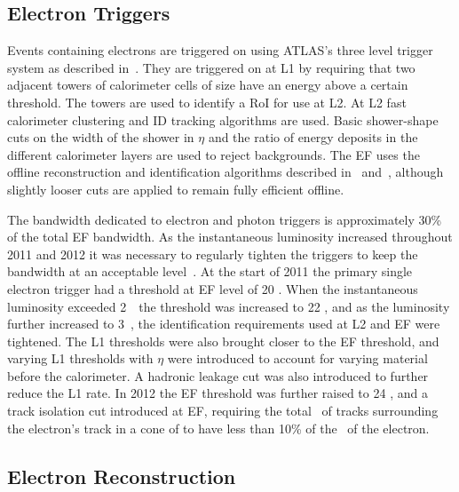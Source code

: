 \subsection{Electron Triggers}
\label{sec:reco-el-triggers}

Events containing electrons are triggered on using ATLAS's three level trigger
system as described in~. They are triggered on at L1 by
requiring that two adjacent towers of calorimeter cells of size
 have an energy above a certain threshold. The towers
are used to identify a RoI for use at L2. At L2 fast calorimeter clustering and
ID tracking algorithms are used. 
Basic shower-shape cuts on the width of the shower in $\eta$ and the ratio of
energy deposits in the different calorimeter layers are used to reject
backgrounds. The EF uses the offline reconstruction and identification
algorithms described in~ and~, although
slightly looser cuts are applied to remain fully efficient offline. 

The bandwidth dedicated to electron and photon triggers is approximately 30\% of the
total EF bandwidth. As the instantaneous luminosity increased throughout 2011 and
2012 it was necessary to regularly tighten the triggers to keep the bandwidth at
an acceptable level~\cite{Monticelli:1450947}. At the start of 2011 the primary single electron trigger
had a threshold at EF level of 20 \gev. When the instantaneous luminosity exceeded
2~\instlumiunit\ the threshold was increased to 22 \gev, and as
the luminosity further increased to 3~\instlumiunit, the identification
requirements used at L2 and EF were tightened. The L1 thresholds were also
brought closer to the EF threshold, and varying L1 thresholds with $\eta$ were
introduced to account for varying material before the calorimeter. A hadronic
leakage cut was also introduced to further reduce the L1 rate. In 2012 the EF
threshold was further raised to 24 \gev, and a track isolation cut introduced at
EF, requiring the total \pt\ of tracks surrounding the
electron's track in a cone of  to have less than 10\% of the \pt\ of
the electron.

\subsection{Electron Reconstruction}
\label{sec:reco-el-reco}

